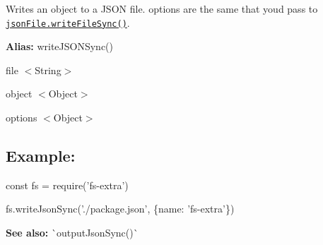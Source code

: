 Writes an object to a J\+S\+ON file. {\ttfamily options} are the same that you\textquotesingle{}d pass to \href{https://github.com/jprichardson/node-jsonfile#writefilesyncfilename-obj-options}{\tt {\ttfamily json\+File.\+write\+File\+Sync()}}.

{\bfseries Alias\+:} {\ttfamily write\+J\+S\+O\+N\+Sync()}


\begin{DoxyItemize}
\item {\ttfamily file} {\ttfamily $<$String$>$}
\item {\ttfamily object} {\ttfamily $<$Object$>$}
\item {\ttfamily options} {\ttfamily $<$Object$>$}
\end{DoxyItemize}

\subsection*{Example\+:}


\begin{DoxyCode}
const fs = require('fs-extra')

fs.writeJsonSync('./package.json', \{name: 'fs-extra'\})
\end{DoxyCode}




{\bfseries See also\+:} \`{}output\+Json\+Sync()\`{} 